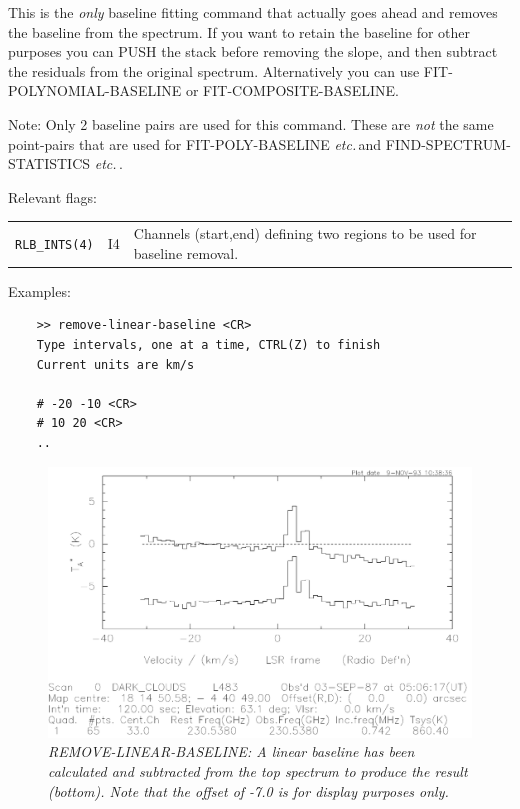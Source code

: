 \documentclass[11pt,twoside]{report}
\newcommand{\etc}{{\it etc.\,}}
\begin{document}
This is the {\em only} baseline fitting command that actually goes ahead
and removes the baseline from the spectrum. If you want to retain the
baseline for other purposes you can PUSH the stack before removing the
slope, and then subtract the residuals from the original spectrum.
Alternatively you can use FIT-POLYNOMIAL-BASELINE or FIT-COMPOSITE-BASELINE.
 

Note: Only 2 baseline pairs are used for this command. These are {\em not} the
same point-pairs that are used for FIT-POLY-BASELINE \etc and
FIND-SPECTRUM-STATISTICS \etc.

Relevant flags:\\
\begin{tabular}{lll}
  \verb+RLB_INTS(4)+ & I4 & \parbox[t]{4in}
                            {Channels (start,end) defining two regions
                             to be used for baseline removal.}
\end{tabular}

Examples:
\begin{verbatim}
    >> remove-linear-baseline <CR>
    Type intervals, one at a time, CTRL(Z) to finish
    Current units are km/s

    # -20 -10 <CR>
    # 10 20 <CR>
    ..
\end{verbatim}

\begin{figure}[htbp]
\begin{center}
\includegraphics[scale=0.65]{r-l-b}
\protect\parbox{5.5in}
{\caption[RLB]
{\sl
REMOVE-LINEAR-BASELINE: A linear baseline has been calculated and subtracted
from the top spectrum to produce the result (bottom). Note that the offset
of -7.0 is for display purposes only.
\label{RLB}
}
}
\end{center}
\end{figure}
\end{document}
